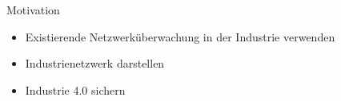 \begin{frame}{Motivation}
    \begin{itemize}[<+->]
      \item Existierende Netzwerküberwachung in der Industrie verwenden
      \item Industrienetzwerk darstellen
      \item Industrie 4.0 sichern
    \end{itemize}
\end{frame}